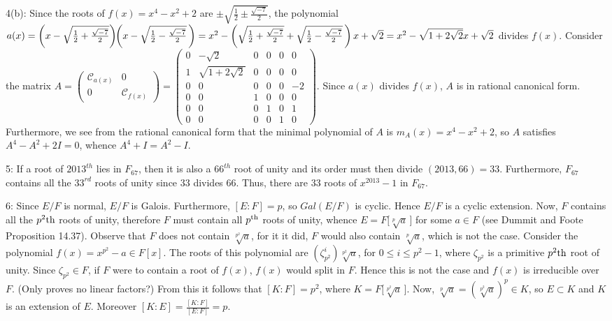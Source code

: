 \documentclass[12pt]{article}
\begin{document}
4(b): Since the roots of $f(x)=x^4-x^2+2$ are $\pm\sqrt{\frac{1}{2}\pm \frac{\sqrt{-7}}{2}}$,
the polynomial
$a(x) = \left(\vphantom{\BIG{4}\vert}x-\sqrt{\frac{1}{2}+\frac{\sqrt{-7}}{2}}\right)\mspace{-5mu}\left(\vphantom{\BIG{4}\vert}x-\sqrt{\frac{1}{2}-\frac{\sqrt{-7}}{2}}\,\right) = x^2-\left(\vphantom{\BIG{4}\vert}\sqrt{\frac{1}{2}+\frac{\sqrt{-7}}{2}}+\sqrt{\frac{1}{2}-\frac{\sqrt{-7}}{2}}\,\right)x+\sqrt{2} = x^2-\sqrt{1+2\sqrt{2}}x+\sqrt{2}$ divides $f(x)$. Consider the matrix $A = \begin{pmatrix}\mathcal{C}_{a(x)}&0\\0&\mathcal{C}_{f(x)}\end{pmatrix} = \begin{pmatrix}0&-\sqrt{2}&0&0&0&0\\1&\sqrt{1+2\sqrt{2}}&0&0&0&0\\0&0&0&0&0&-2\\0&0&1&0&0&0\\0&0&0&1&0&1\\0&0&0&0&1&0\end{pmatrix}$. Since $a(x)$ divides $f(x)$, $A$ is in rational canonical form. Furthermore, we see from the rational canonical form that the minimal polynomial of $A$ is $m_A(x)=x^4-x^2+2$, so $A$ satisfies $A^4-A^2+2I=0$, whence $A^4+I=A^2-I$. \newline

5: If a root of $2013^{th}$ lies in $F_{67}$, then it is also a $66^{th}$ root of unity and its order must then divide $(2013,66)=33$. Furthermore, $F_{67}$ contains all the $33^{rd}$ roots of unity since $33$ divides $66$. Thus, there are 33 roots of $x^{2013}-1$ in $F_{67}$. \newline

6: Since $E/F$ is normal, $E/F$ is Galois. Furthermore, $[E:F]=p$, so $Gal(E/F)$ is cyclic. Hence $E/F$ is a cyclic extension. Now, $F$ contains all the $p^2{\rm th}$ roots of unity, therefore $F$ must contain all $p^{\rm th}$ roots of unity, whence $E=F\bigl[\sqrt[p]{a}\,\bigl]$ for some $a\in F$ (see Dummit and Foote Proposition 14.37). Observe that $F$ does not contain $\sqrt[p^2]{a}$, for it it did, $F$ would also contain $\sqrt[p]{a}$, which is not the case. Consider the polynomial $f(x)=x^{p^2}-a\in F[x]$. The roots of this polynomial are $(\zeta_{p^2}^i)\!\sqrt[p^2]{a}$, for $0\le i\le p^2-1$, where $\zeta_{p^2}$ is a primitive $p^2{\rm th}$ root of unity. Since $\zeta_{p^2}\in F$, if $F$ were to contain a root of $f(x)$, $f(x)$ would split in $F$. Hence this is not the case and $f(x)$ is irreducible over $F$. {\color{red} (Only proves no linear factors?)} From this it follows that $[K:F]=p^2$, where $K=F\bigl[\sqrt[p^2]{a}\,\bigr]$. Now, $\sqrt[p]{a}=(\sqrt[p^2]{a})^p\in K$, so $E\subset K$ and $K$ is an extension of $E$. Moreover $[K:E]=\frac{[K:F]}{[E:F]}=p$.
\end{document}
